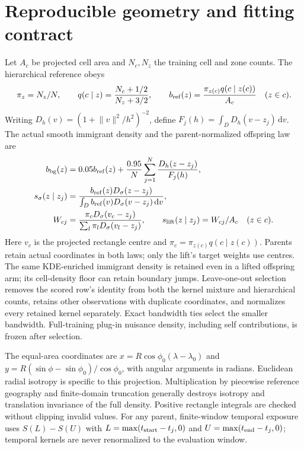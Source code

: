\section{Reproducible geometry and fitting contract}
Let $A_c$ be projected cell area and $N_c,N_z$ the training cell and zone counts. The hierarchical reference obeys
\begin{equation}
 \pi_z=N_z/N,\qquad q(c\mid z)=\frac{N_c+1/2}{N_z+3/2},\qquad
 b_{\rm ref}(z)=\frac{\pi_{z(c)}q(c\mid z(c))}{A_c}\quad(z\in c).
\end{equation}
Writing $D_h(v)=(1+\lVert v\rVert^2/h^2)^{-2}$, define $F_j(h)=\int_D D_h(v-z_j)\,\mathrm dv$. The actual smooth immigrant density and the parent-normalized offspring law are
\begin{align}
 b_{\rm bg}(z)&=0.05b_{\rm ref}(z)+\frac{0.95}{N}\sum_{j=1}^N\frac{D_h(z-z_j)}{F_j(h)},\\
 s_\sigma(z\mid z_j)&=\frac{b_{\rm ref}(z)D_\sigma(z-z_j)}{\int_D b_{\rm ref}(v)D_\sigma(v-z_j)\,\mathrm dv},\\
 W_{cj}&=\frac{\pi_cD_\sigma(v_c-z_j)}{\sum_l\pi_lD_\sigma(v_l-z_j)},\qquad
 s_{\rm lift}(z\mid z_j)=W_{cj}/A_c\quad(z\in c).
\end{align}
Here $v_c$ is the projected rectangle centre and $\pi_c=\pi_{z(c)}q(c\mid z(c))$. Parents retain actual coordinates in both laws; only the lift's target weights use centres. The same KDE-enriched immigrant density is retained even in a lifted offspring arm; its cell-density floor can retain boundary jumps. Leave-one-out selection removes the scored row's identity from both the kernel mixture and hierarchical counts, retains other observations with duplicate coordinates, and normalizes every retained kernel separately. Exact bandwidth ties select the smaller bandwidth. Full-training plug-in nuisance density, including self contributions, is frozen after selection.

The equal-area coordinates are $x=R\cos\phi_0(\lambda-\lambda_0)$ and $y=R(\sin\phi-\sin\phi_0)/\cos\phi_0$, with angular arguments in radians. Euclidean radial isotropy is specific to this projection. Multiplication by piecewise reference geography and finite-domain truncation generally destroys isotropy and translation invariance of the full density. Positive rectangle integrals are checked without clipping invalid values. For any parent, finite-window temporal exposure uses $S(L)-S(U)$ with $L=\max(t_{\rm start}-t_j,0)$ and $U=\max(t_{\rm end}-t_j,0)$; temporal kernels are never renormalized to the evaluation window.

